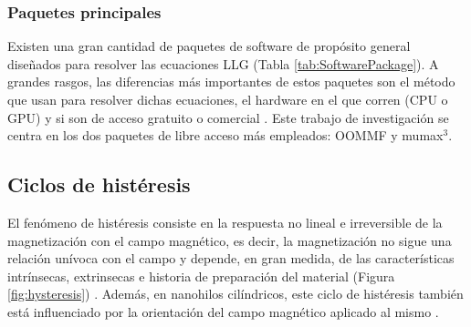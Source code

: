 \subsubsection{Paquetes principales}
Existen una gran cantidad de paquetes de software de propósito general diseñados para resolver las ecuaciones LLG (Tabla \ref{tab:SoftwarePackage}). A grandes rasgos, las diferencias más importantes de estos paquetes son el método que usan para resolver dichas ecuaciones, el hardware en el que corren (CPU o GPU) y si son de acceso gratuito o comercial \cite{Tomorrow}. Este trabajo de investigación se centra en los dos paquetes de libre acceso más empleados: OOMMF y mumax$^3$.
\begin{table}[htp!]
    \centering
    \renewcommand{\tablename}{\textbf{Tabla}}
    \renewcommand\thetable{\textbf{\arabic{table}}}
    \caption{Lista de paquetes de software de propósito general \cite{Tomorrow}.}
    \label{tab:SoftwarePackage}
\end{table}

\subsection{Ciclos de histéresis}
El fenómeno de histéresis consiste en la respuesta no lineal e irreversible de la magnetización con el campo magnético, es decir, la magnetización no sigue una relación unívoca con el campo y depende, en gran medida, de las características intrínsecas, extrinsecas e historia de preparación del material (Figura \ref{fig:hysteresis}) \cite{coey_2010,jackson2012classical}. Además, en nanohilos cilíndricos, este ciclo de histéresis también está influenciado por la orientación del campo magnético aplicado al mismo \cite{CylindricalMagneticNonowires}.

